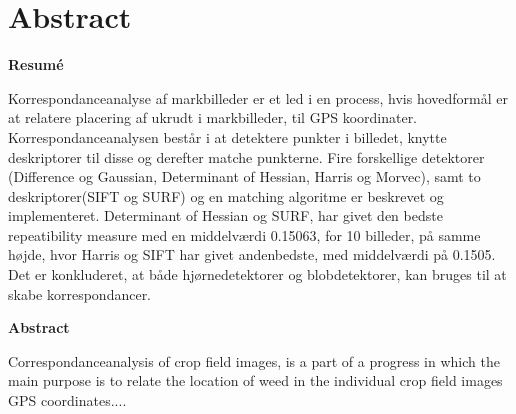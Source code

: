 \chapter{Abstract} \label{sec:abstract}
\begin{center}
\textbf{Resumé}
\end{center}
Korrespondanceanalyse af markbilleder er et led i en process, hvis hovedformål er at relatere placering af ukrudt i markbilleder, til GPS koordinater. Korrespondanceanalysen består i at detektere punkter i billedet, knytte deskriptorer til disse og derefter matche punkterne. Fire forskellige detektorer (Difference og Gaussian, Determinant of Hessian, Harris og Morvec), samt to deskriptorer(SIFT og SURF) og en matching algoritme er beskrevet og implementeret. Determinant of Hessian og SURF, har givet den bedste repeatibility measure med en middelværdi 0.15063, for 10 billeder, på samme højde, hvor Harris og SIFT har givet andenbedste, med middelværdi på 0.1505. Det er konkluderet, at både hjørnedetektorer og blobdetektorer, kan bruges til at skabe korrespondancer.
\begin{center}
\textbf{Abstract}
\end{center}
Correspondanceanalysis of crop field images, is a part of a progress in which the main purpose is to relate the location of weed in the individual crop field images GPS coordinates....